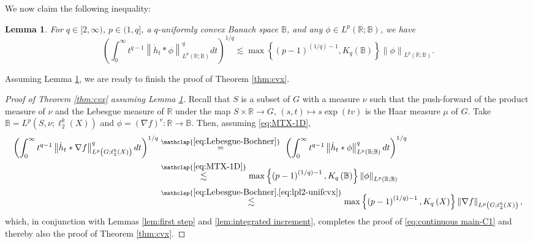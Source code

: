\documentclass[11pt,reqno]{amsart}
\newtheorem{lemma}[theorem]{Lemma}
\newcommand{\1}{\mathbf 1}
\begin{document}
We now claim the following inequality:
\begin{lemma}\label{lem:gHL}
	For $q\in [2,\infty)$, $p\in (1,q]$, a 
	$q$-uniformly convex Banach space $\mathbb{B}$, and any $\phi\in L^p\left(\mathbb{R};\mathbb{B}\right)$, we have
	\begin{equation}\label{eq:MTX-1D}
		\left(\int_0^\infty t^{q-1}\left\|\dot{h}_t *\phi\right\|_{L^p\left(\mathbb{R};\mathbb{B}\right)}^qdt\right)^{1/q}
		\lesssim \max\left\{\left(p-1\right)^{(1/q)-1},K_q\left(\mathbb{B}\right)\right\} \left\|\phi\right\|_{L^p\left(\mathbb{R};\mathbb{B}\right)}.
	\end{equation}
\end{lemma}

Assuming Lemma \ref{lem:gHL}, we are ready to finish the proof of Theorem \ref{thm:cvx}.

\begin{proof}[Proof of Theorem \ref{thm:cvx} assuming Lemma \ref{lem:gHL}]
Recall that $S$ is a subset of $G$ with a measure $\nu$ such that the push-forward of the product measure of $\nu$ and the Lebesgue measure of $\mathbb{R}$ under the map $S\times \mathbb{R}\to G$, $\left(s,t\right)\mapsto s\exp\left(tv\right)$ is the Haar measure $\mu$ of $G$. Take $\mathbb{B}=L^p\left(S,\nu;\ell_2^k\left(X\right)\right)$ and  $\phi=\left(\nabla f\right)^v:\mathbb{R}\to \mathbb{B}$. Then, assuming \eqref{eq:MTX-1D},
\begin{align*}
	\left(\int_0^\infty t^{q-1}\left\|\dot{h}_t*\nabla f\right\|_{L^p\left(G;\ell_2^k\left(X\right)\right)}^qdt\right)^{1/q}
	&\stackrel{\mathclap{\eqref{eq:Lebesgue-Bochner}}}{=}~\left(\int_0^\infty t^{q-1}\left\|\dot{h}_t *\phi\right\|_{L^p\left(\mathbb{R};\mathbb{B}\right)}^qdt\right)^{1/q}\\
	&\stackrel{\mathclap{\eqref{eq:MTX-1D}}}{\lesssim} \max\left\{\left(p-1\right)^{(1/q)-1},K_q\left(\mathbb{B}\right)\right\} \left\|\phi\right\|_{L^p\left(\mathbb{R};\mathbb{B}\right)}\\
	&\stackrel{\mathclap{\eqref{eq:Lebesgue-Bochner},\eqref{eq:lpl2-unifcvx}}}{\lesssim} \max\left\{\left(p-1\right)^{(1/q)-1},K_q\left(X\right)\right\}\left\|\nabla f\right\|_{L^p\left(G;\ell_2^k\left(X\right)\right)},
\end{align*}
which, in conjunction with Lemmas \ref{lem:first step} and \ref{lem:integrated increment}, completes the proof of \eqref{eq:continuous main-C1} and thereby also the proof of Theorem \ref{thm:cvx}.
\end{proof}
\end{document}
